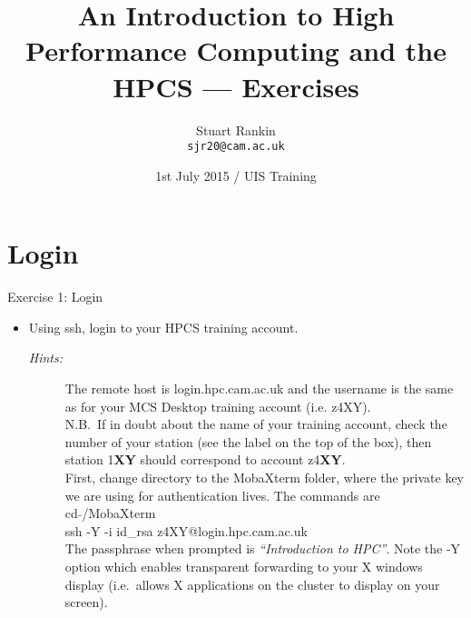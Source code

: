 \documentclass{beamer}
\title[HPC: An introduction --- Exercises] %
{An Introduction to High Performance Computing and the HPCS --- Exercises}
\author[SJ Rankin] %
{Stuart Rankin\\ \texttt{sjr20@cam.ac.uk}}
\institute[HPCS, University of Cambridge] %
{High Performance Computing Service (http://www.hpc.cam.ac.uk/)\\
University Information Services (http://www.uis.cam.ac.uk/)}
\date[01/07/2015] %
{1st July 2015 / UIS Training}
\begin{document}
\begin{frame}
  \titlepage
\end{frame}

\section{Login}
\begin{frame}{Exercise 1: Login}
\begin{itemize}
\item{Using ssh, login to your HPCS training account.}
\begin{description}
\item[\emph{Hints:}]{\small The remote host is \alert{login.hpc.cam.ac.uk} and the username is the same as for your MCS Desktop training account (i.e. \alert{z4XY}).\hfill\\\smallskip
{\scriptsize N.B.\ If in doubt about the name of your training account, check the number of your station (see the label on the top of the box), then station 1\textbf{XY} should correspond to account z4\textbf {XY}.}\hfill\\\smallskip
First, change directory to the MobaXterm folder, where the private key we are using for authentication lives. The commands are\hfill\\
\alert{cd $\tilde{}$/MobaXterm}\hfill\\
\alert{ssh -Y -i id\_rsa z4XY@login.hpc.cam.ac.uk}\hfill\\
The passphrase when prompted is \alert{\emph{``Introduction to HPC''}}. Note the -Y option which enables transparent forwarding to your X windows display (i.e.\ allows X applications on the cluster to display on your screen).}
\end{description}
\end{itemize}
\end{frame}
\end{document}
